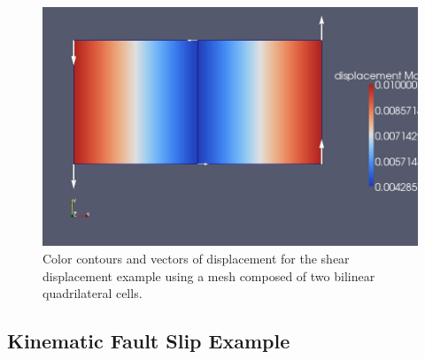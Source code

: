 \begin{figure}
\begin{centering}
\includegraphics[scale=0.33]{tutorials/twocells/figs/twoquad4-sheardisp}
\par\end{centering}

\caption{Color contours and vectors of displacement for the shear displacement
example using a mesh composed of two bilinear quadrilateral cells.\label{fig:twoquad4-shear}}
\end{figure}



\subsection{Kinematic Fault Slip Example}

